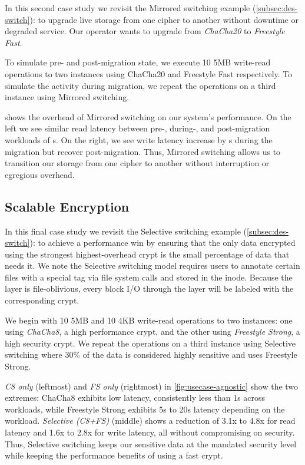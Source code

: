 In this second case study we revisit the Mirrored switching example
(\cref{subsec:des-switch}): to upgrade live storage from one cipher to another
without downtime or degraded service. Our operator wants to upgrade from {\em
ChaCha20} to {\em Freestyle Fast}.

To simulate pre- and post-migration state, we execute 10 5MB write-read
operations to two \sys instances using ChaCha20 and Freestyle Fast respectively.
To simulate the activity during migration, we repeat the operations on a third
instance using Mirrored switching.



 shows the overhead of Mirrored switching on our
system's performance. On the left we see similar read latency between pre-,
during-, and post-migration workloads of s. On the right, we see write
latency increase by s during the migration but recover post-migration.
Thus, Mirrored switching allows us to transition our storage from one cipher to
another without interruption or egregious overhead.


\subsection{Scalable Encryption}\label{subsec:usecase-agnostic}

In this final case study we revisit the Selective switching example
(\cref{subsec:des-switch}): to achieve a performance win by ensuring that the
only data encrypted using the strongest highest-overhead crypt is the small
percentage of data that needs it. We note the Selective switching model requires
users to annotate certain files with a special tag via file system calls and
stored in the inode. Because the \sys layer is file-oblivious, every block I/O
through the \sys layer will be labeled with the corresponding crypt.

We begin with 10 5MB and 10 4KB write-read operations to two \sys instances: one
using {\em ChaCha8}, a high performance crypt, and the other using {\em
Freestyle Strong}, a high security crypt. We repeat the operations on a third
instance using Selective switching where 30\% of the data is considered highly
sensitive and uses Freestyle Strong.



{\em C8 only} (leftmost) and {\em FS only} (rightmost) in
\cref{fig:usecase-agnostic} show the two extremes: ChaCha8 exhibits low latency,
consistently less than 1s across workloads, while Freestyle Strong exhibits 5s
to 20s latency depending on the workload. {\em Selective (C8+FS)} (middle) shows
a reduction of 3.1x to 4.8x for read latency and 1.6x to 2.8x for write latency,
all without compromising on security. Thus, Selective switching keeps our
sensitive data at the mandated security level while keeping the performance
benefits of using a fast crypt.
